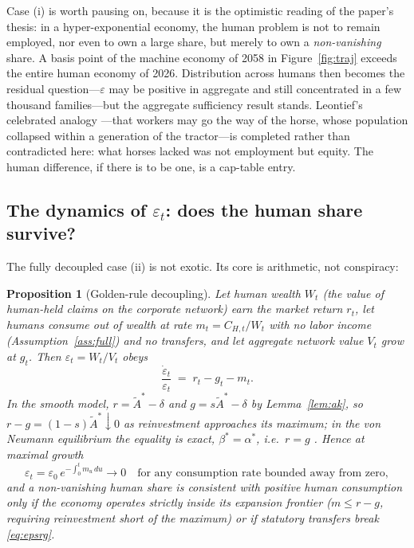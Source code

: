 \documentclass[11pt]{article}
\newtheorem{proposition}{Proposition}
\newcommand{\eps}{\varepsilon}
\begin{document}
Case (i) is worth pausing on, because it is the optimistic reading of the paper's thesis: in a hyper-exponential economy, the human problem is not to remain employed, nor even to own a large share, but merely to own a \emph{non-vanishing} share. A basis point of the machine economy of 2058 in Figure~\ref{fig:traj} exceeds the entire human economy of 2026. Distribution across humans then becomes the residual question---$\eps$ may be positive in aggregate and still concentrated in a few thousand families---but the aggregate sufficiency result stands. Leontief's celebrated analogy \citep{leontief1983}---that workers may go the way of the horse, whose population collapsed within a generation of the tractor---is completed rather than contradicted here: what horses lacked was not employment but equity. The human difference, if there is to be one, is a cap-table entry.

\subsection{The dynamics of \texorpdfstring{$\eps_t$}{epsilon}: does the human share survive?}

The fully decoupled case (ii) is not exotic. Its core is arithmetic, not conspiracy:

\begin{proposition}[Golden-rule decoupling]\label{prop:goldenrule}
Let human wealth $W_t$ (the value of human-held claims on the corporate network) earn the market return $r_t$, let humans consume out of wealth at rate $m_t = C_{H,t}/W_t$ with no labor income (Assumption~\ref{ass:full}) and no transfers, and let aggregate network value $V_t$ grow at $g_t$. Then $\eps_t = W_t/V_t$ obeys
\begin{equation}
\frac{\dot\eps_t}{\eps_t} \;=\; r_t - g_t - m_t.
\label{eq:epsrg}
\end{equation}
In the smooth model, $r = \tilde A^{*}-\delta$ and $g = s\tilde A^{*}-\delta$ by Lemma~\ref{lem:ak}, so $r-g = (1-s)\tilde A^{*} \downarrow 0$ as reinvestment approaches its maximum; in the von Neumann equilibrium the equality is exact, $\beta^{*}=\alpha^{*}$, i.e.\ $r=g$ \citep{vonneumann1945,phelps1961}. Hence at maximal growth
\[
\eps_t = \eps_0\, e^{-\int_0^t m_u\,du} \longrightarrow 0 \quad \text{for any consumption rate bounded away from zero},
\]
and a non-vanishing human share is consistent with positive human consumption only if the economy operates strictly inside its expansion frontier ($m \le r-g$, requiring reinvestment short of the maximum) or if statutory transfers break \eqref{eq:epsrg}.
\end{proposition}
\end{document}
